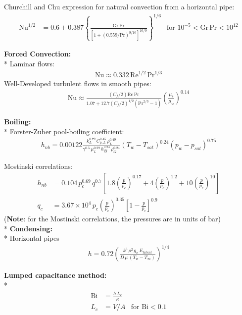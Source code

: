 \begin{datasheet}
Churchill and Chu expression for natural convection from a
horizontal pipe:
\begin{align*}
  \text{Nu}^{1/2} &= 0.6 + 0.387
  \left\{\frac{\text{Gr}\,\text{Pr}}{\left[1 + \left(0.559 /
          \text{Pr}\right)^{9/16}\right]^{16/9}}\right\}^{1/6} &
  \text{for $10^{-5}<\text{Gr}\,\text{Pr}<10^{12}$}
\end{align*}%

{\bf Forced Convection:}\\*
Laminar flows:
\begin{align*}
  \text{Nu} \approx 0.332\,\text{Re}^{1/2}\,\text{Pr}^{1/3}
\end{align*}
Well-Developed turbulent flows in smooth pipes:
\begin{align*}
  \text{Nu} \approx \frac{(C_f/2)
    \text{Re}\,\text{Pr}}{1.07+12.7(C_f/2)^{1/2}\left(\text{Pr}^{2/3}
      -1\right)}\left(\frac{\mu_b}{\mu_w}\right)^{0.14}
\end{align*}

{\bf Boiling:}\\*
Forster-Zuber pool-boiling coefficient:
\begin{align*}
  h_{nb}=0.00122\frac{k_L^{0.79}\, C_{p,L}^{0.45}\, \rho_L^{0.49}}{\gamma^{0.5}\,\mu_L^{0.29}\,h_{fg}^{0.24}\,\rho_G^{0.24}}\left(T_w - T_{sat}\right)^{0.24}\left(p_w-p_{sat}\right)^{0.75}
\end{align*}

Mostinski correlations: 
\begin{align*}
  h_{nb} &= 0.104\,p_c^{0.69}\,q^{0.7}\left[1.8\left(\frac{p}{p_c}\right)^{0.17}+4\left(\frac{p}{p_c}\right)^{1.2}+10\left(\frac{p}{p_c}\right)^{10}\right]\\
  q_c &=
  3.67\times10^4\,p_c\left(\frac{p}{p_c}\right)^{0.35}\left[1-\frac{p}{p_c}\right]^{0.9}
\end{align*}
({\bf Note}: for the Mostinski correlations, the pressures are in units of bar)\\*
{\bf Condensing:}\\*
Horizontal pipes
\begin{align*}
  h = 0.72
  \left(\frac{k^3\,\rho^2\,g_x\,E_{latent}}{D\,\mu\,\left(T_w-T_\infty\right)}\right)^{1/4}
\end{align*}

{\bf Lumped capacitance method:}\\*
\begin{align*}
  \text{Bi} &= \frac{h\,L_c}{\kappa} & \\
  L_c &= 
  V/A & \text{for $\text{Bi}<0.1$}
\end{align*}


\end{datasheet}
